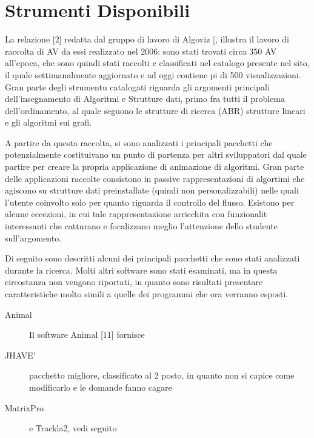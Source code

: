 \section{\label{sec:Strumenti-Disponibili}Strumenti Disponibili}

La relazione {[}2{]} redatta dal gruppo di lavoro di Algoviz {[}\textonesuperior{}{]},
illustra il lavoro di raccolta di AV da essi realizzato nel 2006:
sono stati trovati circa 350 AV all'epoca, che sono quindi stati raccolti
e classificati nel catalogo presente nel sito, il quale  settimanalmente
aggiornato e ad oggi contiene pi di 500 visualizzazioni. Gran parte
degli strumentu catalogati riguarda gli argomenti principali dell'insegnamento
di Algoritmi e Strutture dati, primo fra tutti il problema dell'ordinamento,
al quale seguono le strutture di ricerca (ABR) strutture lineari e
gli algoritmi sui grafi.

A partire da questa raccolta, si sono analizzati i principali pacchetti
che potenzialmente costituivano un punto di partenza per altri sviluppatori
dal quale partire per creare la propria applicazione di animazione
di algoritmi. Gran parte delle applicazioni raccolte consistono in
passive rappresentazioni di algortimi che agiscono su strutture dati
preinstallate (quindi non personalizzabili) nelle quali l'utente 
coinvolto solo per quanto riguarda il controllo del flusso. Esistono
per alcune eccezioni, in cui tale rappresentazione  arricchita con
funzionalit interessanti che catturano e focalizzano meglio l'attenzione
dello studente sull'argomento.

Di seguito sono descritti alcuni dei principali pacchetti che sono
stati analizzati durante la ricerca. Molti altri software sono stati
esaminati, ma in questa circostanza non vengono riportati, in quanto
sono risultati presentare caratteristiche molto simili a quelle dei
programmi che ora verranno esposti.
\begin{description}
\item [{Animal}] Il software Animal {[}11{]} fornisce 
\item [{JHAVE'}] pacchetto migliore, classificato al 2 posto, in quanto
non si capice come modificarlo e le domande fanno cagare
\item [{MatrixPro}] e Trackla2, vedi seguito
\end{description}